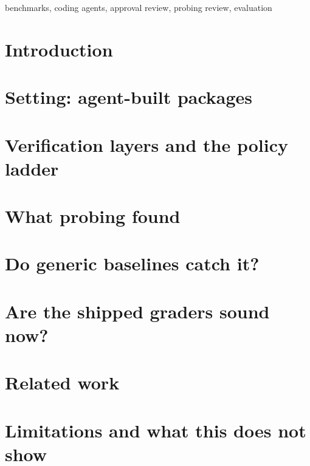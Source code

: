 \documentclass[twoside,11pt]{article}
\begin{document}
\begin{keywords}
benchmarks, coding agents, approval review, probing review, evaluation
\end{keywords}

\section{Introduction}



\section{Setting: \suitePackages{} agent-built packages}
\label{sec:setting}



\section{Verification layers and the policy ladder}
\label{sec:layers}


\section{What probing found}
\label{sec:review}



\section{Do generic baselines catch it?}
\label{sec:prereg}


\section{Are the shipped graders sound now?}
\label{sec:soundness}



\section{Related work}


\section{Limitations and what this does not show}
\label{sec:limits}

\FloatBarrier
\end{document}
